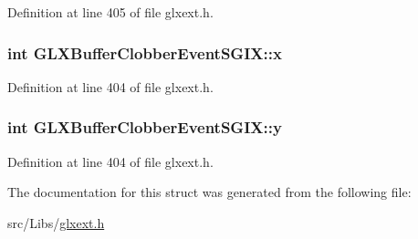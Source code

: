 Definition at line 405 of file glxext.h.

\hypertarget{struct_g_l_x_buffer_clobber_event_s_g_i_x_a5118d48c3c8d5253d39922b5014b52ff}{
\subsubsection[{x}]{\setlength{\rightskip}{0pt plus 5cm}int {\bf GLXBufferClobberEventSGIX::x}}}
\label{struct_g_l_x_buffer_clobber_event_s_g_i_x_a5118d48c3c8d5253d39922b5014b52ff}


Definition at line 404 of file glxext.h.

\hypertarget{struct_g_l_x_buffer_clobber_event_s_g_i_x_aef21efa11558a5b67861f96471c56003}{
\subsubsection[{y}]{\setlength{\rightskip}{0pt plus 5cm}int {\bf GLXBufferClobberEventSGIX::y}}}
\label{struct_g_l_x_buffer_clobber_event_s_g_i_x_aef21efa11558a5b67861f96471c56003}


Definition at line 404 of file glxext.h.



The documentation for this struct was generated from the following file:\begin{DoxyCompactItemize}
\item 
src/Libs/\hyperlink{glxext_8h}{glxext.h}\end{DoxyCompactItemize}
